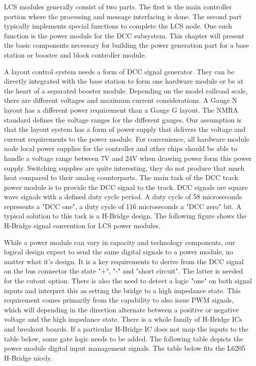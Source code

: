 
LCS modules generally consist of two parts. The first is the main controller portion where the processing and message interfacing is done. The second part typically implements special functions to complete the LCS node. One such function is the power module for the DCC subsystem. This chapter will present the basic components necessary for building the power generation part for a base station or booster and block controller module.


A layout control system needs a form of DCC signal generator. They can be directly integrated with the base station to form one hardware module or be at the heart of a separated booster module. Depending on the model railroad scale, there are different voltages and maximum current considerations. A Gauge N layout has a different power requirement than a Gauge G layout. The NMRA standard defines the voltage ranges for the different gauges. Our assumption is that the layout system has a form of power supply that delivers the voltage and current requirements to the power module. For convenience, all hardware module node local power supplies for the controller and other chips should be able to handle a voltage range between 7V and 24V when drawing power form this power supply. Switching supplies are quite interesting, they do not produce that much heat compared to their analog counterparts. The main task of the DCC track power module is to provide the DCC signal to the track. DCC signals are square wave signals with a defined duty cycle period. A duty cycle of 58 microseconds represents a "DCC one", a duty cycle of 116 microseconds a "DCC zero" bit. A typical solution to this task is a H-Bridge design. The following figure shows the H-Bridge signal convention for LCS power modules.


While a power module can vary in capacity and technology components, our logical design expect to send the same digital signals to a power module, no matter what it's design. It is a key requirements to derive from the DCC signal on the bus connector the state "+", "-" and "short circuit". The latter is needed for the cutout option. There is also the need to detect a logic "one" on both signal inputs and interpret this as setting the bridge to a high impedance state. This requirement comes primarily from the capability to also issue PWM signals, which will depending in the direction alternate between a positive or negative voltage and the high impedance state. There is a whole family of H-Bridge ICs and breakout boards. If a particular H-Bridge IC does not map the inputs to the table below, some gate logic needs to be added. The following table depicts the power module digital input management signals. The table below fits the L6205 H-Bridge nicely.

